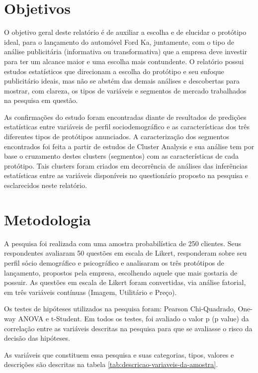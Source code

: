 \section{Objetivos}

\label{sec:objetivos}

O objetivo geral deste relatório é de auxiliar a escolha e de elucidar
o protótipo ideal, para o lançamento do automóvel Ford Ka\texttrademark, juntamente,
com o tipo de análise publicitária (informativa ou transformativa)
que a empresa deve investir para ter um alcance maior e uma escolha
mais contundente. O relatório possui estudos estatísticos que direcionam
a escolha do protótipo e seu enfoque publicitário ideais, mas não
se abstém das demais análises e descobertas para mostrar, com clareza,
os tipos de variáveis e segmentos de mercado trabalhados na pesquisa
em questão. 

As confirmações do estudo foram encontradas diante de resultados de
predições estatísticas entre variáveis de perfil sociodemográfico
e as características dos três diferentes tipos de protótipos anunciados.
A caracterização dos segmentos encontrados foi feita a partir de estudos
de Cluster Analysis e sua análise tem por base o cruzamento destes
clusters (segmentos) com as características de cada protótipo. Tais
clusters foram criados em decorrência de análises das inferências
estatísticas entre as variáveis disponíveis no questionário proposto
na pesquisa e esclarecidos neste relatório.


\section{Metodologia}

A pesquisa foi realizada com uma amostra probabilística de 250 clientes.
Seus respondentes avaliaram 50 questões em escala de Likert, responderam
sobre seu perfil sócio demográfico e psicográfico e analisaram os
três protótipos de lançamento, propostos pela empresa, escolhendo
aquele que mais gostaria de possuir. As questões em escala de Likert
foram convertidas, via análise fatorial, em três variáveis contínuas
(Imagem, Utilitário e Preço).

Os testes de hipóteses utilizados na pesquisa foram: Pearson Chi-Quadrado,
One-way ANOVA e t-Student. Em todos os testes, foi avaliado o valor
p (p value) da correlação entre as variáveis descritas na pesquisa
para que se avaliasse o risco da decisão das hipóteses.

As variáveis que constituem essa pesquisa e suas categorias, tipos,
valores e descrições são descritas na tabela \ref{tab:descricao-variaveis-da-amostra}.

